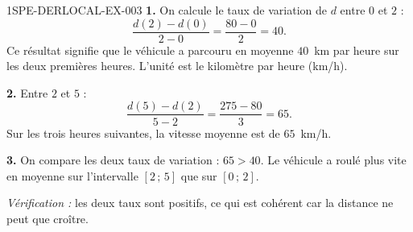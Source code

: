 \begin{corrige}{1SPE-DERLOCAL-EX-003}
\textbf{1.} On calcule le taux de variation de $d$ entre $0$ et $2$ :
\[
\frac{d(2)-d(0)}{2-0}=\frac{80-0}{2}=40.
\]
Ce résultat signifie que le véhicule a parcouru en moyenne $40$~km par heure sur les deux premières heures. L'unité est le kilomètre par heure (km/h).

\textbf{2.} Entre $2$ et $5$ :
\[
\frac{d(5)-d(2)}{5-2}=\frac{275-80}{3}=65.
\]
Sur les trois heures suivantes, la vitesse moyenne est de $65$~km/h.

\textbf{3.} On compare les deux taux de variation : $65>40$. Le véhicule a roulé plus vite en moyenne sur l'intervalle $[2\,;\,5]$ que sur $[0\,;\,2]$.

\textit{Vérification :} les deux taux sont positifs, ce qui est cohérent car la distance ne peut que croître.
\end{corrige}
